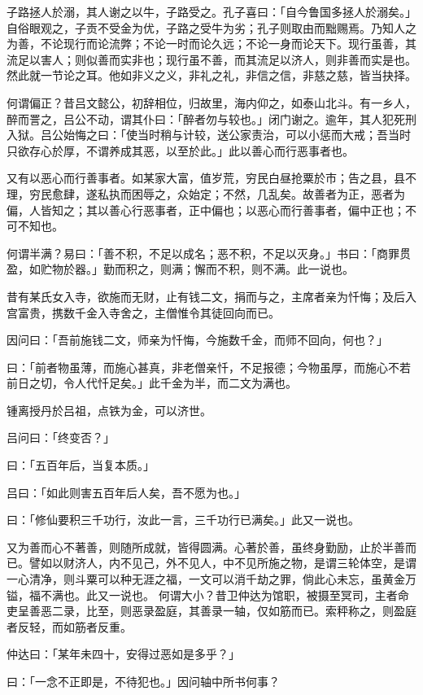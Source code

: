 \documentclass[letterpaper,10pt,english]{sphinxmanual}
\begin{document}
子路拯人於溺，其人谢之以牛，子路受之。孔子喜曰：「自今鲁国多拯人於溺矣。」自俗眼观之，子贡不受金为优，子路之受牛为劣；孔子则取由而黜赐焉。乃知人之为善，不论现行而论流弊；不论一时而论久远；不论一身而论天下。现行虽善，其流足以害人；则似善而实非也；现行虽不善，而其流足以济人，则非善而实是也。然此就一节论之耳。他如非义之义，非礼之礼，非信之信，非慈之慈，皆当抉择。

何谓偏正？昔吕文懿公，初辞相位，归故里，海内仰之，如泰山北斗。有一乡人，醉而詈之，吕公不动，谓其仆曰：「醉者勿与较也。」闭门谢之。逾年，其人犯死刑入狱。吕公始悔之曰：「使当时稍与计较，送公家责治，可以小惩而大戒；吾当时只欲存心於厚，不谓养成其恶，以至於此。」此以善心而行恶事者也。

又有以恶心而行善事者。如某家大富，值岁荒，穷民白昼抢粟於市；告之县，县不理，穷民愈肆，遂私执而困辱之，众始定；不然，几乱矣。故善者为正，恶者为偏，人皆知之；其以善心行恶事者，正中偏也；以恶心而行善事者，偏中正也；不可不知也。

何谓半满？易曰：「善不积，不足以成名；恶不积，不足以灭身。」书曰：「商罪贯盈，如贮物於器。」勤而积之，则满；懈而不积，则不满。此一说也。

昔有某氏女入寺，欲施而无财，止有钱二文，捐而与之，主席者亲为忏悔；及后入宫富贵，携数千金入寺舍之，主僧惟令其徒回向而已。

因问曰：「吾前施钱二文，师亲为忏悔，今施数千金，而师不回向，何也？」

曰：「前者物虽薄，而施心甚真，非老僧亲忏，不足报德；今物虽厚，而施心不若前日之切，令人代忏足矣。」此千金为半，而二文为满也。

锺离授丹於吕祖，点铁为金，可以济世。

吕问曰：「终变否？」

曰：「五百年后，当复本质。」

吕曰：「如此则害五百年后人矣，吾不愿为也。」

曰：「修仙要积三千功行，汝此一言，三千功行已满矣。」此又一说也。

又为善而心不著善，则随所成就，皆得圆满。心著於善，虽终身勤励，止於半善而已。譬如以财济人，内不见己，外不见人，中不见所施之物，是谓三轮体空，是谓一心清净，则斗粟可以种无涯之福，一文可以消千劫之罪，倘此心未忘，虽黄金万镒，福不满也。此又一说也。 何谓大小？昔卫仲达为馆职，被摄至冥司，主者命吏呈善恶二录，比至，则恶录盈庭，其善录一轴，仅如筋而已。索秤称之，则盈庭者反轻，而如筋者反重。

仲达曰：「某年未四十，安得过恶如是多乎？」

曰：「一念不正即是，不待犯也。」因问轴中所书何事？
\end{document}
